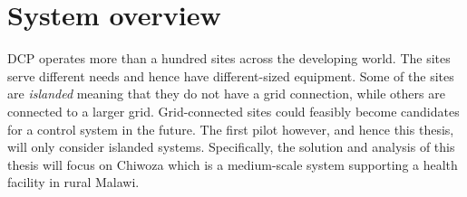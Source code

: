 \section{System overview}
DCP operates more than a hundred sites across the developing world. The sites serve different needs and hence have different-sized equipment. Some of the sites are \textit{islanded} meaning that they do not have a grid connection, while others are connected to a larger grid. Grid-connected sites could feasibly become candidates for a control system in the future. The first pilot however, and hence this thesis, will only consider islanded systems. Specifically, the solution and analysis of this thesis will focus on Chiwoza which is a medium-scale system supporting a health facility in rural Malawi.\\

